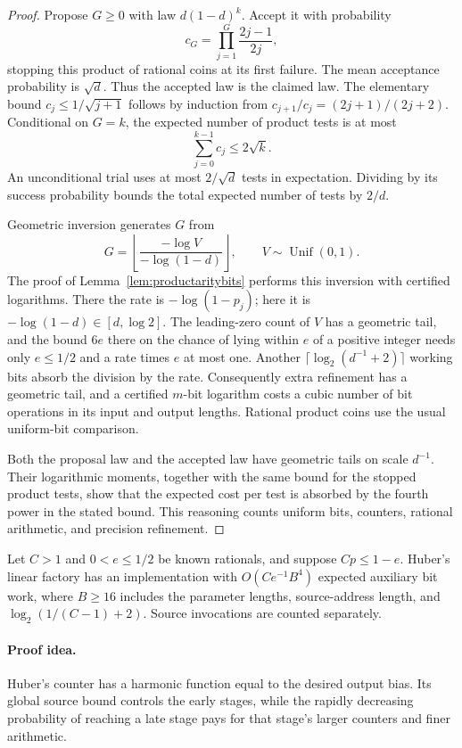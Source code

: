 \begin{proof}
Propose $G\ge0$ with law $d(1-d)^k$. Accept it with probability
\[
 c_G=\prod_{j=1}^G\frac{2j-1}{2j},
\]
stopping this product of rational coins at its first failure.
The mean acceptance probability is $\sqrt d$. Thus the accepted
law is the claimed law. The elementary bound
$c_j\le1/\sqrt{j+1}$ follows by induction from
$c_{j+1}/c_j=(2j+1)/(2j+2)$. Conditional on $G=k$, the expected
number of product tests is at most
\[
 \sum_{j=0}^{k-1}c_j\le2\sqrt k.
\]
An unconditional trial uses at most $2/\sqrt d$ tests in
expectation. Dividing by its success probability bounds the
total expected number of tests by $2/d$.

Geometric inversion generates $G$ from
\[
 G=\left\lfloor\frac{-\log V}{-\log(1-d)}\right\rfloor,
 \qquad V\sim\operatorname{Unif}(0,1).
\]
The proof of Lemma~\ref{lem:productaritybits} performs this
inversion with certified logarithms. There the rate is
$-\log(1-p_j)$; here it is $-\log(1-d)\in[d,\log2]$. The
leading-zero count of $V$ has a geometric tail, and the bound $6e$ there
on the chance of lying within $e$ of a positive integer needs only
$e\le1/2$ and a rate times $e$ at most one. Another
$\lceil\log_2(d^{-1}+2)\rceil$ working bits absorb the division by
the rate. Consequently extra refinement has a geometric tail, and a
certified $m$-bit logarithm costs a cubic number of bit operations
in its input and output lengths. Rational product coins use the
usual uniform-bit comparison.

Both the proposal law and the accepted law have geometric
tails on scale $d^{-1}$. Their logarithmic moments, together
with the same bound for the stopped product tests, show that
the expected cost per test is absorbed by the fourth power in
the stated bound. This reasoning counts uniform bits,
counters, rational arithmetic, and precision refinement.
\end{proof}

\begin{lemma}
\label{lem:general-linear-bits}
\label{lem:rmslinearbits}
Let $C>1$ and $0<e\le1/2$ be known rationals, and suppose $Cp\le1-e$.
Huber's linear factory has an implementation with
$O(Ce^{-1}B^4)$ expected auxiliary bit work, where $B\ge16$ includes
the parameter lengths, source-address length, and
$\log_2(1/(C-1)+2)$. Source invocations are counted separately.
\end{lemma}
\paragraph{Proof idea.}
Huber's counter has a harmonic function equal to the desired output
bias. Its global source bound controls the early stages, while the rapidly
decreasing probability of reaching a late stage pays for that stage's larger
counters and finer arithmetic.

